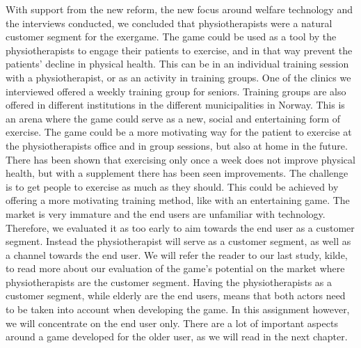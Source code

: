 With support from the new reform, the new focus around welfare technology and the interviews conducted, we concluded that physiotherapists were a natural customer segment for the exergame. The game could be used as a tool by the physiotherapists to engage their patients to exercise, and in that way prevent the patients’ decline in physical health. This can be in an individual training session with a physiotherapist, or as an activity in training groups. One of the clinics we interviewed offered a weekly training group for seniors. Training groups are also offered in different institutions in the different municipalities in Norway. This is an arena where the game could serve as a new, social and entertaining form of exercise. The game could be a more motivating way for the patient to exercise at the physiotherapists office and in group sessions, but also at home in the future. There has been shown that exercising only once a week does not improve physical health, but with a supplement there has been seen improvements. The challenge is to get people to exercise as much as they should. This could be achieved by offering a more motivating training method, like with an entertaining game. The market is very immature and the end users are unfamiliar with technology. Therefore, we evaluated it as too early to aim towards the end user as a customer segment. Instead the physiotherapist will serve as a customer segment, as well as a channel towards the end user. We will refer the reader to our last study, kilde, to read more about our evaluation of the game's potential on the market where physiotherapists are the customer segment. Having the physiotherapists as a customer segment, while elderly are the end users, means that both actors need to be taken into account when developing the game. In this assignment however, we will concentrate on the end user only. There are a lot of important aspects around a game developed for the older user, as we will read in the next chapter.  